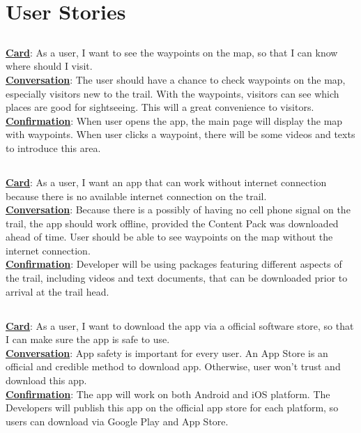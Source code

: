 \documentclass[letterpaper,10pt,titlepage]{article}
\begin{document}
\section{User Stories}
\subsection{ }
\textbf{\underline{Card}}: As a user, I want to see the waypoints on the map, so that I can know where should I visit.\\ 
\textbf{\underline{Conversation}}: The user should have a chance to check waypoints on the map, especially visitors new to the trail. With the waypoints, visitors can see which places are good for sightseeing. This will a great convenience to visitors.\\
\textbf{\underline{Confirmation}}: When user opens the app, the main page will display the map with waypoints. When user clicks a waypoint, there will be some videos and texts to introduce this area.

\subsection{ }
\textbf{\underline{Card}}: As a user, I want an app that can work without internet connection because there is no available internet connection on the trail.\\
\textbf{\underline{Conversation}}: Because there is a possibly of having no cell phone signal on the trail, the app should work offline, provided the Content Pack was downloaded ahead of time. User should be able to see waypoints on the map without the internet connection.\\
\textbf{\underline{Confirmation}}: Developer will be using packages featuring different aspects of the trail, including videos and text documents, that can be downloaded prior to arrival at the trail head.
\subsection{ }
\textbf{\underline{Card}}: As a user, I want to download the app via a official software store, so that I can make sure the app is safe to use.\\
\textbf{\underline{Conversation}}: App safety is important for every user. An App Store is an official and credible method to download app. Otherwise, user won’t trust and download this app.\\
\textbf{\underline{Confirmation}}: The app will work on both Android and iOS platform. The Developers will publish this app on the official app store for each platform, so users can download via Google Play and App Store.
\end{document}
